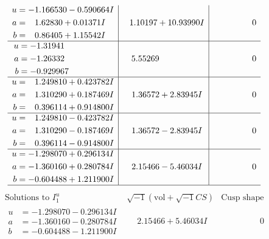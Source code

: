 \documentclass[1p]{elsarticle_modified}
\theoremstyle{definition}
\newcommand{\I}{\sqrt{-1}}
\begin{document}
$$\begin{array}{c|c|c}
\begin{aligned}
u &= -1.166530 - 0.590664 I \\
a &= \phantom{-}1.62830 + 0.01371 I \\
b &= \phantom{-}0.86405 + 1.15542 I\end{aligned}
 & \phantom{-}1.10197 + 10.93990 I & \phantom{-0.000000 } 0 \\ \hline\begin{aligned}
u &= -1.31941\phantom{ +0.000000I} \\
a &= -1.26332\phantom{ +0.000000I} \\
b &= -0.929967\phantom{ +0.000000I}\end{aligned}
 & \phantom{-}5.55269\phantom{ +0.000000I} & \phantom{-0.000000 } 0 \\ \hline\begin{aligned}
u &= \phantom{-}1.249810 + 0.423782 I \\
a &= \phantom{-}1.310290 + 0.187469 I \\
b &= \phantom{-}0.396114 + 0.914800 I\end{aligned}
 & \phantom{-}1.36572 + 2.83945 I & \phantom{-0.000000 } 0 \\ \hline\begin{aligned}
u &= \phantom{-}1.249810 - 0.423782 I \\
a &= \phantom{-}1.310290 - 0.187469 I \\
b &= \phantom{-}0.396114 - 0.914800 I\end{aligned}
 & \phantom{-}1.36572 - 2.83945 I & \phantom{-0.000000 } 0 \\ \hline\begin{aligned}
u &= -1.298070 + 0.296134 I \\
a &= -1.360160 + 0.280784 I \\
b &= -0.604488 + 1.211900 I\end{aligned}
 & \phantom{-}2.15466 - 5.46034 I & \phantom{-0.000000 } 0\\
 \hline 
 \end{array}$$\newpage$$\begin{array}{c|c|c}  
\text{Solutions to }I^u_{1}& \I (\text{vol} + \sqrt{-1}CS) & \text{Cusp shape}\\
 \hline 
\begin{aligned}
u &= -1.298070 - 0.296134 I \\
a &= -1.360160 - 0.280784 I \\
b &= -0.604488 - 1.211900 I\end{aligned}
 & \phantom{-}2.15466 + 5.46034 I & \phantom{-0.000000 } 0 \\ \hline\begin{aligned}

\end{aligned}
\end{array}$$
\end{document}
